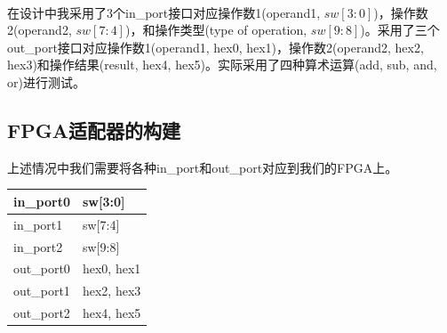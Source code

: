 \documentclass[UTF8]{ctexart}
\begin{document}
\paragraph{}

在设计中我采用了3个in\_port接口对应操作数1(operand1, $sw[3:0]$)，操作数2(operand2, $sw[7:4]$)，和操作类型(type of operation, $sw[9:8]$)。采用了三个out\_port接口对应操作数1(operand1, hex0, hex1)，操作数2(operand2, hex2, hex3)和操作结果(result, hex4, hex5)。实际采用了四种算术运算(add, sub, and, or)进行测试。

\subsection{FPGA适配器的构建}
上述情况中我们需要将各种in\_port和out\_port对应到我们的FPGA上。
\newline
\begin{tabular}{|l|l|} %
	\hline
	in\_port0 & sw[3:0] \\
	\hline
	in\_port1 & sw[7:4] \\
    \hline
    in\_port2 & sw[9:8] \\
    \hline
    out\_port0 & hex0, hex1 \\
    \hline
    out\_port1 & hex2, hex3 \\
    \hline
    out\_port2 & hex4, hex5 \\
    \hline
\end{tabular}
\end{document}
